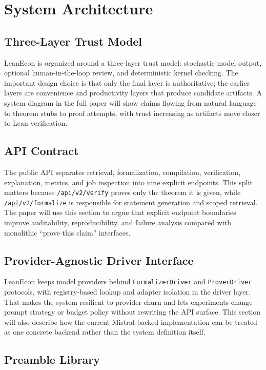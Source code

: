 \documentclass[11pt,letterpaper]{article}
\begin{document}
\section{System Architecture}

\subsection{Three-Layer Trust Model}

LeanEcon is organized around a three-layer trust model: stochastic model output, optional human-in-the-loop review, and deterministic kernel checking. The important design choice is that only the final layer is authoritative; the earlier layers are convenience and productivity layers that produce candidate artifacts. A system diagram in the full paper will show claims flowing from natural language to theorem stubs to proof attempts, with trust increasing as artifacts move closer to Lean verification.

\subsection{API Contract}

The public API separates retrieval, formalization, compilation, verification, explanation, metrics, and job inspection into nine explicit endpoints. This split matters because \texttt{/api/v2/verify} proves only the theorem it is given, while \texttt{/api/v2/formalize} is responsible for statement generation and scoped retrieval. The paper will use this section to argue that explicit endpoint boundaries improve auditability, reproducibility, and failure analysis compared with monolithic ``prove this claim'' interfaces.

\subsection{Provider-Agnostic Driver Interface}

LeanEcon keeps model providers behind \texttt{FormalizerDriver} and \texttt{ProverDriver} protocols, with registry-based lookup and adapter isolation in the driver layer. That makes the system resilient to provider churn and lets experiments change prompt strategy or budget policy without rewriting the API surface. This section will also describe how the current Mistral-backed implementation can be treated as one concrete backend rather than the system definition itself.

\subsection{Preamble Library}
\end{document}
